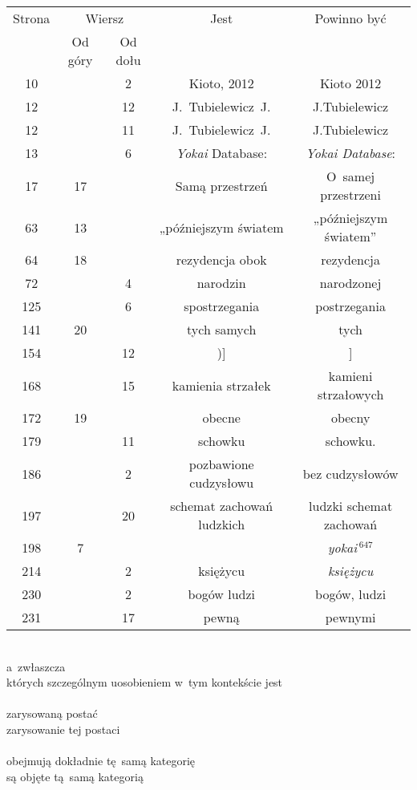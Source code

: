 \documentclass[a4paper,11pt]{article}
\begin{document}
\begin{center}

  \begin{tabular}{|c|c|c|c|c|}
    \hline
    Strona & \multicolumn{2}{c|}{Wiersz} & Jest
                              & Powinno być \\ \cline{2-3}
    & Od góry & Od dołu & & \\
    \hline
    10  & &  2 & Kioto, 2012 & Kioto 2012 \\
    12  & & 12 & J.~Tubielewicz~J. & J.Tubielewicz \\
    12  & & 11 & J.~Tubielewicz~J. & J.Tubielewicz \\
    13  & &  6 & \textit{Yokai} Database: & \textit{Yokai Database}: \\
    17  & 17 & & Samą przestrzeń & O~samej przestrzeni \\
    63  & 13 & & „późniejszym światem & „późniejszym światem” \\
    64  & 18 & & rezydencja obok & rezydencja \\
    72  & &  4 & narodzin & narodzonej \\
    125 & &  6 & spostrzegania & postrzegania \\
    141 & 20 & & tych samych & tych \\
    154 & & 12 & )] & ] \\
    168 & & 15 & kamienia strzałek & kamieni strzałowych \\
    172 & 19 & & obecne & obecny \\
    179 & & 11 & schowku & schowku. \\
    186 & &  2 & pozbawione cudzysłowu & bez cudzysłowów \\
    197 & & 20 & schemat zachowań ludzkich & ludzki schemat zachowań \\
    198 &  7 & & & \textit{yokai$\,^{647}$} \\  %
    214 & &  2 & księżycu & \textit{księżycu} \\
    230 & &  2 & bogów ludzi & bogów, ludzi \\
    231 & & 17 & pewną & pewnymi \\
    \hline
  \end{tabular}

\end{center}

\vspace{\spaceTwo}


\noindent
{} \\
\Jest  a~zwłaszcza \\
\Powin których szczególnym uosobieniem w~tym kontekście jest \\
 \\
\Jest  zarysowaną postać \\
\Powin zarysowanie tej postaci \\
 \\
\Jest  obejmują dokładnie tę~samą kategorię \\
\Powin są objęte tą~samą kategorią \\
\end{document}

